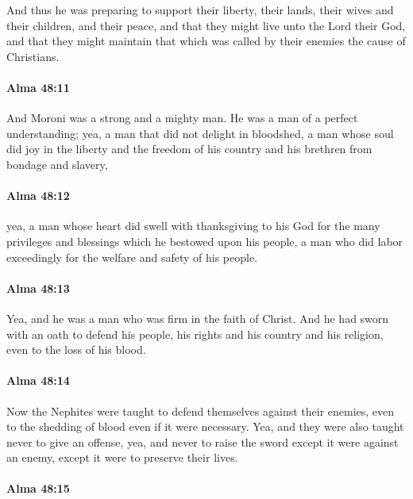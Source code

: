 			And thus he was preparing to support their liberty,
			their lands, their wives and their children, and their peace,
			and that they might live unto the Lord their God,
			and that they might maintain
			that which was called by their enemies the cause of Christians.

		\paragraph{Alma 48:11} %
			\label{ALMA-48-11}

			And Moroni was a strong and a mighty man.
			He was a man of a perfect understanding;
			yea, a man that did not delight in bloodshed,
			a man whose soul did joy in the liberty
			and the freedom of his country and his brethren from bondage and slavery,

		\paragraph{Alma 48:12} %
			\label{ALMA-48-12}

			yea, a man whose heart did swell with thanksgiving to his God
			for the many privileges and blessings which he bestowed upon his people,
			a man who did labor exceedingly for the welfare and safety of his people.

		\paragraph{Alma 48:13} %
			\label{ALMA-48-13}

			Yea, and he was a man who was firm in the faith of Christ.
			And he had sworn with an oath to defend his people,
			his rights and his country and his religion,
			even to the loss of his blood.

		\paragraph{Alma 48:14} %
			\label{ALMA-48-14}

			Now the Nephites were taught to defend themselves against their enemies,
			even to the shedding of blood even if it were necessary.
			Yea, and they were also taught never to give an offense,
			yea, and never to raise the sword
			except it were against an enemy,
			except it were to preserve their lives.

		\paragraph{Alma 48:15} %
			\label{ALMA-48-15}

